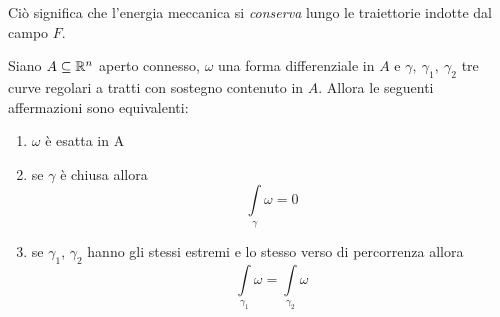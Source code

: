 Ciò significa che l'energia meccanica si \textit{conserva} lungo le traiettorie indotte dal campo $F$.
\begin{theorem} \label{Teo: Caratterizzazione forme esatte}
Siano $A \subseteq \mathbb{R}^n$ aperto connesso, $\omega$ una forma differenziale in $A$ e $\gamma,\ \gamma_1,\ \gamma_2$ tre curve regolari a tratti con sostegno contenuto in $A$. Allora le seguenti affermazioni sono equivalenti:
\begin{enumerate}
    \item $\omega$ è esatta in A
    \item se $\gamma$ è chiusa allora 
    \begin{equation}
        \int\limits_{\gamma}{\omega}=0
    \end{equation}
    \item se $\gamma_1$, $\gamma_2$ hanno gli stessi estremi e lo stesso verso di percorrenza allora
    \begin{equation}
        \int\limits_{\gamma_1}{\omega} = \int\limits_{\gamma_2}{\omega}
    \end{equation}
\end{enumerate}
\end{theorem}
